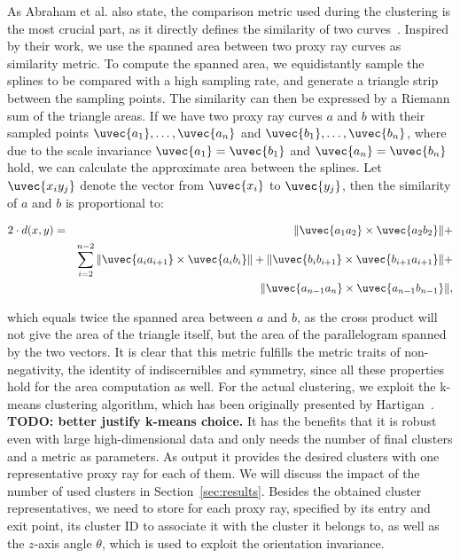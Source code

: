 \documentclass[review,journal]{vgtc}         %
\begin{document}
As Abraham et al. also state, the comparison metric used during the clustering is the most crucial part, as it directly defines the similarity of two curves~\cite{abraham03clustering}. Inspired by their work, we use the spanned area between two proxy ray curves as similarity metric. To compute the spanned area, we equidistantly sample the splines to be compared with a high sampling rate, and generate a triangle strip between the sampling points. The similarity can then be expressed by a Riemann sum of the triangle areas. If we have two proxy ray curves $a$ and $b$ with their sampled points $\uvec{a_1},\dots,\uvec{a_n}$ and $\uvec{b_1},\dots,\uvec{b_n}$, where due to the scale invariance $\uvec{a_1}=\uvec{b_1}$ and $\uvec{a_n}=\uvec{b_n}$ hold, we can calculate the approximate area between the splines. Let $\uvec{x_iy_j}$ denote the vector from $\uvec{x_i}$ to $\uvec{y_j}$, then the similarity of $a$ and $b$ is proportional to:

\begin{eqnarray*}
2\cdot d(x,y) &=& \Vert\uvec{a_1a_2} \times \uvec{a_2b_2}\Vert + \\
&& \sum_{i=2}^{n-2}\Vert\uvec{a_ia_{i+1}} \times \uvec{a_ib_i} \Vert + \Vert\uvec{b_ib_{i+1}} \times \uvec{b_{i+1}a_{i+1}}\Vert + \\
&& \Vert\uvec{a_{n-1}a_n} \times \uvec{a_{n-1}b_{n-1}}\Vert,
\end{eqnarray*}

\noindent which equals twice the spanned area between $a$ and $b$, as the cross product will not give the area of the triangle itself, but the area of the parallelogram spanned by the two vectors. It is clear that this metric fulfills the metric traits of non-negativity, the identity of indiscernibles and symmetry, since all these properties hold for the area computation as well. For the actual clustering, we exploit the k-means clustering algorithm, which has been originally presented by Hartigan~\cite{hartigan75kmeans}. \textbf{TODO: better justify k-means choice.} It has the benefits that it is robust even with large high-dimensional data and only needs the number of final clusters and a metric as parameters. As output it provides the desired clusters with one representative proxy ray for each of them. We will discuss the impact of the number of used clusters in Section~\ref{sec:results}. Besides the obtained cluster representatives, we need to store for each proxy ray, specified by its entry and exit point, its cluster ID to associate it with the cluster it belongs to, as well as the $z$-axis angle $\theta$, which is used to exploit the orientation invariance.
\end{document}
